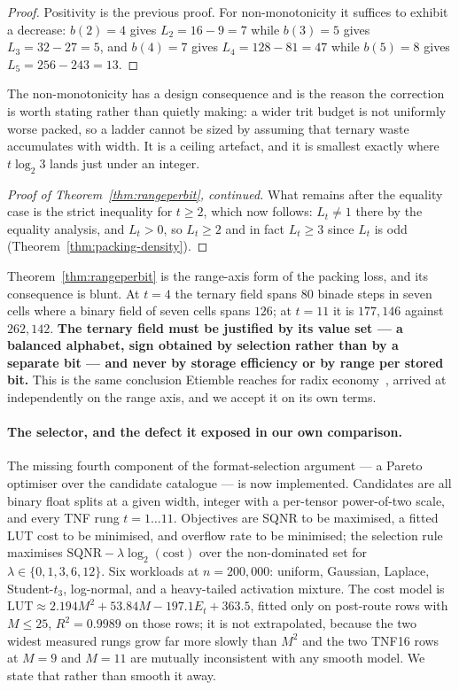 \documentclass[11pt]{article}
\theoremstyle{definition}
\begin{document}
\begin{proof}
Positivity is the previous proof. For non-monotonicity it suffices to exhibit a
decrease: $b(2) = 4$ gives $L_2 = 16 - 9 = 7$ while $b(3) = 5$ gives
$L_3 = 32 - 27 = 5$, and $b(4) = 7$ gives $L_4 = 128 - 81 = 47$ while $b(5) = 8$
gives $L_5 = 256 - 243 = 13$.
\end{proof}

The non-monotonicity has a design consequence and is the reason the correction is
worth stating rather than quietly making: a wider trit budget is not uniformly
worse packed, so a ladder cannot be sized by assuming that ternary waste
accumulates with width. It is a ceiling artefact, and it is smallest exactly where
$t\log_2 3$ lands just under an integer.

\begin{proof}[Proof of Theorem~\ref{thm:rangeperbit}, continued]
What remains after the equality case is the strict inequality for $t \ge 2$, which
now follows: $L_t \ne 1$ there by the equality analysis, and $L_t > 0$, so
$L_t \ge 2$ and in fact $L_t \ge 3$ since $L_t$ is odd
(Theorem~\ref{thm:packing-density}).
\end{proof}

Theorem~\ref{thm:rangeperbit} is the range-axis form of the packing loss, and its
consequence is blunt. At $t = 4$ the ternary field spans $80$ binade steps in
seven cells where a binary field of seven cells spans $126$; at $t = 11$ it is
$177{,}146$ against $262{,}142$. \textbf{The ternary field must be justified by
its value set --- a balanced alphabet, sign obtained by selection rather than by a
separate bit --- and never by storage efficiency or by range per stored bit.}
This is the same conclusion Etiemble reaches for radix
economy~\cite{etiemble2019}, arrived at independently on the range axis,
and we accept it on its own terms.

\paragraph{The selector, and the defect it exposed in our own comparison.}
The missing fourth component of the format-selection argument --- a Pareto
optimiser over the candidate catalogue --- is now implemented. Candidates are all
binary float splits at a given width, integer with a per-tensor power-of-two
scale, and every TNF rung $t = 1 \ldots 11$. Objectives are SQNR to be maximised,
a fitted LUT cost to be minimised, and overflow rate to be minimised; the
selection rule maximises $\mathrm{SQNR} - \lambda\log_2(\mathrm{cost})$ over the
non-dominated set for $\lambda \in \{0,1,3,6,12\}$. Six workloads at
$n = 200{,}000$: uniform, Gaussian, Laplace, Student-$t_3$, log-normal, and a
heavy-tailed activation mixture. The cost model is
$\mathrm{LUT} \approx 2.194 M^2 + 53.84 M - 197.1 E_t + 363.5$, fitted only on
post-route rows with $M \le 25$, $R^2 = 0.9989$ on those rows; it is not
extrapolated, because the two widest measured rungs grow far more slowly than
$M^2$ and the two TNF16 rows at $M = 9$ and $M = 11$ are mutually inconsistent
with any smooth model. We state that rather than smooth it away.
\end{document}
